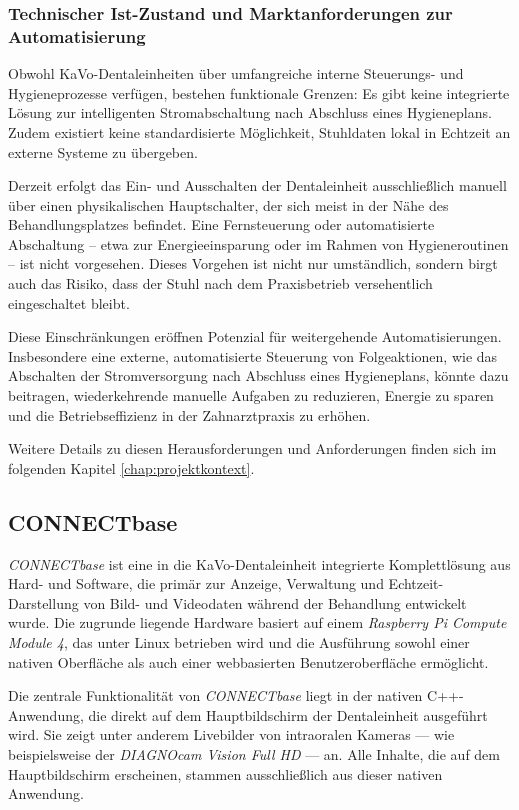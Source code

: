 \subsubsection{Technischer Ist-Zustand und Marktanforderungen zur Automatisierung}
\label{sec:aktueller-stand-und-automatisierungsanforderung}
Obwohl KaVo-Dentaleinheiten über umfangreiche interne Steuerungs- und Hygieneprozesse verfügen, bestehen funktionale Grenzen: Es gibt keine integrierte Lösung zur intelligenten Stromabschaltung nach Abschluss eines Hygieneplans. Zudem existiert keine standardisierte Möglichkeit, Stuhldaten lokal in Echtzeit an externe Systeme zu übergeben.

Derzeit erfolgt das Ein- und Ausschalten der Dentaleinheit ausschließlich manuell über einen physikalischen Hauptschalter, der sich meist in der Nähe des Behandlungsplatzes befindet. Eine Fernsteuerung oder automatisierte Abschaltung – etwa zur Energieeinsparung oder im Rahmen von Hygieneroutinen – ist nicht vorgesehen. Dieses Vorgehen ist nicht nur umständlich, sondern birgt auch das Risiko, dass der Stuhl nach dem Praxisbetrieb versehentlich eingeschaltet bleibt.

Diese Einschränkungen eröffnen Potenzial für weitergehende Automatisierungen. Insbesondere eine externe, automatisierte Steuerung von Folgeaktionen, wie das Abschalten der Stromversorgung nach Abschluss eines Hygieneplans, könnte dazu beitragen, wiederkehrende manuelle Aufgaben zu reduzieren, Energie zu sparen und die Betriebseffizienz in der Zahnarztpraxis zu erhöhen.

Weitere Details zu diesen Herausforderungen und Anforderungen finden sich im folgenden Kapitel \ref{chap:projektkontext}.

\subsection{CONNECTbase}

\textit{CONNECTbase} ist eine in die KaVo-Dentaleinheit integrierte Komplettlösung aus Hard- und Software, die primär zur Anzeige, Verwaltung und Echtzeit-Darstellung von Bild- und Videodaten während der Behandlung entwickelt wurde. Die zugrunde liegende Hardware basiert auf einem \textit{Raspberry Pi Compute Module 4}, das unter Linux betrieben wird und die Ausführung sowohl einer nativen Oberfläche als auch einer webbasierten Benutzeroberfläche ermöglicht.

Die zentrale Funktionalität von \textit{CONNECTbase} liegt in der nativen C++-Anwendung, die direkt auf dem Hauptbildschirm der Dentaleinheit ausgeführt wird. Sie zeigt unter anderem Livebilder von intraoralen Kameras — wie beispielsweise der \textit{DIAGNOcam Vision Full HD} — an. Alle Inhalte, die auf dem Hauptbildschirm erscheinen, stammen ausschließlich aus dieser nativen Anwendung.

